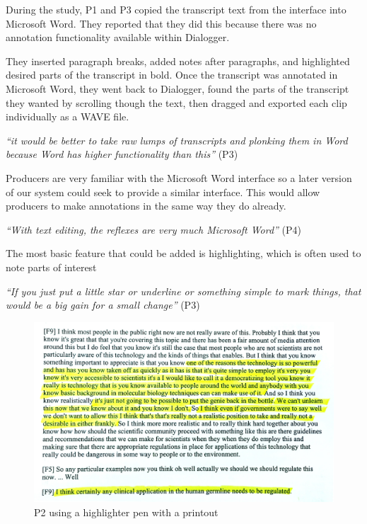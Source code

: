 During the study, P1 and P3 copied the transcript text from the interface into Microsoft Word. They
reported that they did this because there was no annotation functionality
available within Dialogger.

They inserted paragraph breaks, added notes after paragraphs, and
highlighted desired parts of the transcript in bold. Once the transcript was
annotated in Microsoft Word, they went back to Dialogger, found the parts of the
transcript they wanted by scrolling though the text, then dragged and
exported each clip individually as a WAVE file.

\textit{``it would be better to take raw lumps of transcripts and plonking them
  in Word because Word has higher functionality than this''} (P3)

Producers are very familiar with the Microsoft Word interface so a later version of our
system could seek to provide a similar interface. This would allow producers to make annotations in the same way they
do already.

\textit{``With text editing, the reflexes are very much Microsoft Word''} (P4)

The most basic feature that could be added is highlighting, which is often used to note parts of interest

\textit{``If you just put a little star or underline or something simple to
  mark things, that would be a big gain for a small change''} (P3)




\begin{figure}[t]
\centering
  \includegraphics[width=\columnwidth]{figs/highlighting-cropped.jpg}
  \caption{P2 using a highlighter pen with a printout}
  \label{fig:highlight}
\end{figure}

